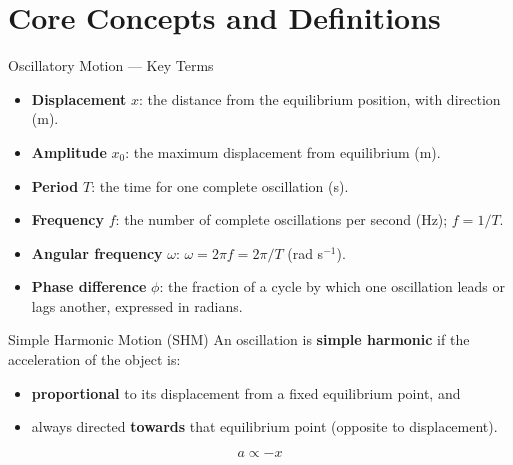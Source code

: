 

\section{Core Concepts and Definitions}

\begin{definitionbox}{Oscillatory Motion — Key Terms}
\begin{itemize}[itemsep=2pt]
  \item \textbf{Displacement} $x$: the distance from the equilibrium position, with direction (m).
  \item \textbf{Amplitude} $x_0$: the maximum displacement from equilibrium (m).
  \item \textbf{Period} $T$: the time for one complete oscillation (s).
  \item \textbf{Frequency} $f$: the number of complete oscillations per second (Hz); $f = 1/T$.
  \item \textbf{Angular frequency} $\omega$: $\omega = 2\pi f = 2\pi/T$ (rad s$^{-1}$).
  \item \textbf{Phase difference} $\phi$: the fraction of a cycle by which one oscillation leads or lags another, expressed in radians.
\end{itemize}
\end{definitionbox}

\begin{definitionbox}{Simple Harmonic Motion (SHM)}
An oscillation is \textbf{simple harmonic} if the acceleration of the object is:
\begin{itemize}[itemsep=2pt]
  \item \textbf{proportional} to its displacement from a fixed equilibrium point, and
  \item always directed \textbf{towards} that equilibrium point (opposite to displacement).
\end{itemize}
$$a \propto -x$$
\end{definitionbox}

